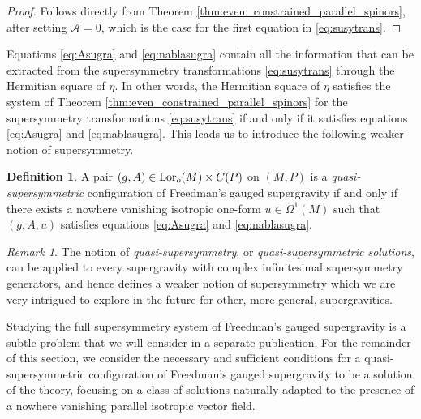 \documentclass[10pt,a4paper,twoside,reqno]{amsart}
\theoremstyle{plain}
\theoremstyle{definition}
\newtheorem{definition}[thm]{Definition}
\theoremstyle{remark}
\newtheorem{remark}[thm]{Remark}
\def\cA{\mathcal{A}}
\newcommand{\Lor}{{\rm Lor}}
\begin{document}
\begin{proof}
Follows directly from Theorem \ref{thm:even_constrained_parallel_spinors}, after setting $\cA = 0$, which is the case for the first equation in \eqref{eq:susytrans}.
\end{proof}

Equations \eqref{eq:Asugra} and \eqref{eq:nablasugra} contain all the information that can be extracted from the supersymmetry transformations \eqref{eq:susytrans} through the Hermitian square of $\eta$. In other words, the Hermitian square of $\eta$ satisfies the system of Theorem \ref{thm:even_constrained_parallel_spinors} for the supersymmetry transformations \eqref{eq:susytrans} if and only if it satisfies equations \eqref{eq:Asugra} and \eqref{eq:nablasugra}. This leads us to introduce the following weaker notion of supersymmetry.

\begin{definition}
A pair $(g,A)\in \Lor_o(M)\times C(P)$ on $(M,P)$ is a \emph{quasi-supersymmetric} configuration of Freedman's gauged supergravity if and only if there exists a nowhere vanishing isotropic one-form $u\in \Omega^1(M)$ such that $(g,A,u)$ satisfies equations  \eqref{eq:Asugra} and \eqref{eq:nablasugra}.
\end{definition}

\begin{remark}
The notion of \emph{quasi-supersymmetry}, or \emph{quasi-supersymmetric solutions}, can be applied to every supergravity with complex infinitesimal supersymmetry generators, and hence defines a weaker notion of supersymmetry which we are very intrigued to explore in the future for other, more general, supergravities. 
\end{remark}

Studying the full supersymmetry system of Freedman's gauged supergravity is a subtle problem that we will consider in a separate publication. For the remainder of this section, we consider the necessary and sufficient conditions for a quasi-supersymmetric configuration of Freedman's gauged supergravity to be a solution of the theory, focusing on a class of solutions naturally adapted to the presence of a nowhere vanishing parallel isotropic vector field.
\end{document}
